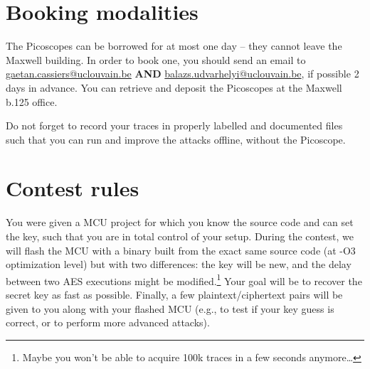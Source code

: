 \section{Booking modalities}
The Picoscopes can be borrowed for at most one day -- they cannot leave the Maxwell building.
In order to book one, you should send an email to \url{gaetan.cassiers@uclouvain.be} \textbf{AND} \url{balazs.udvarhelyi@uclouvain.be}, if possible 2 days in advance. You can retrieve and deposit the Picoscopes at the Maxwell b.125 office.

Do not forget to record your traces in properly labelled and documented files such that you can run and improve the attacks offline, without the Picoscope.

\section{Contest rules}
You were given a MCU project for which you know the source code and can set the key, such that you are in total control of your setup.
During the contest, we will flash the MCU with a binary built from the exact same source code (at -O3 optimization level) but with two differences: the key will be new, and the delay between two AES executions might be modified.\footnote{%
    Maybe you won't be able to acquire 100k traces in a few seconds anymore\dots
}
Your goal will be to recover the secret key as fast as possible.
Finally, a few plaintext/ciphertext pairs will be given to you along with your flashed MCU (e.g., to test if your key guess is correct, or to perform more advanced attacks).
